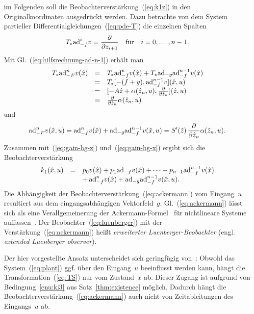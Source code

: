 im Folgenden soll die Beobachterverstärkung~(\ref{eq:k1z}) in den
Originalkoordinaten ausgedrückt werden. Dazu betrachte von dem System
partieller Differentialgleichungen~(\ref{eq:pde-T}) die einzelnen
Spalten 
\[
T_{*}{\operatorname{ad}}_{-f}^{i}v=\frac{\partial}{\partial z_{i+1}}\quad\textrm{für}\quad i=0,\ldots,n-1.
\]
Mit Gl.~(\ref{eq:hilfsrechnung-ad-n-1}) erhält man 
\[
\begin{array}{ccl}
T_{*}{\operatorname{ad}}_{-F}^{n}v(\hat{x}) & = & T_{*}{\operatorname{ad}}_{-f}^{n}v(\hat{x})+T_{*}{\operatorname{ad}}_{-g}{\operatorname{ad}}_{-f}^{n-1}v(\hat{x})\\
 & = & T_{*}[-(f+g),{\operatorname{ad}}_{-f}^{n-1}v](\hat{x},u)\\
 & = & [-A\hat{z}+\alpha(\hat{z}_{n},u),\frac{\partial}{\partial\hat{z}_{n}}](\hat{z},u)\\
 & = & \frac{\partial}{\partial\hat{z}_{n}}\alpha(\hat{z}_{n},u)
\end{array}
\]
und
\begin{equation}
{\operatorname{ad}}_{-F}^{n}v(\hat{x},u)={\operatorname{ad}}_{-f}^{n}v(\hat{x})+{\operatorname{ad}}_{-g}{\operatorname{ad}}_{-f}^{n-1}v(\hat{x},u)=S^{\prime}(\hat{z})\,\frac{\partial}{\partial\hat{z}_{n}}\alpha(\hat{z}_{n},u).\label{eq:ad-n}
\end{equation}
Zusammen mit~(\ref{eq:gain-hg-z}) und~(\ref{eq:gain-hg-x}) ergibt
sich die Beobachterverstärkung 
\begin{equation}
\begin{array}{lcl}
k_{1}(\hat{x},u) & = & p_{0}v(\hat{x})+p_{1}{\operatorname{ad}}_{-f}v(\hat{x})+\cdots+p_{n-1}{\operatorname{ad}}_{-f}^{n-1}v(\hat{x})\\
 &  & +\,{\operatorname{ad}}_{-f}^{n}v(\hat{x})+{\operatorname{ad}}_{-g}{\operatorname{ad}}_{-f}^{n-1}v(\hat{x},u).
\end{array}\label{eq:ackermann}
\end{equation}
Die Abhängigkeit der Beobachterverstärkung~(\ref{eq:ackermann})
vom Eingang~$u$ resultiert aus dem eingangsabhängigen Vektorfeld~$g$.
Gl.~(\ref{eq:ackermann}) lässt sich als eine Verallgemeinerung der
Ackermann-Formel~\cite{ackermann77} für nichtlineare Systeme auffassen~\cite{bestle83,zeitz87}.
Der Beobachter~(\ref{eq:luenberger}) mit der Verstärkung~(\ref{eq:ackermann})
heißt \emph{erweiterter Luenberger-Beobachter}
(engl. \emph{extended Luenberger observer}).

Der hier vorgestellte Ansatz unterscheidet sich geringfügig von~\cite{zeitz87}:
Obwohl das \hbox{System}~(\ref{eq:plant}) ggf. über den Eingang~$u$
beeinflusst werden kann, hängt die Transformation~(\ref{eq:TS})
nur vom Zustand~$x$ ab. Dieser Zugang ist aufgrund von Bedingung~\ref{enu:ki3}
aus Satz~\ref{thm:existence} möglich. Dadurch hängt die Beobachterverstärkung~(\ref{eq:ackermann})
auch nicht von Zeitableitungen des Eingangs~$u$ ab.

